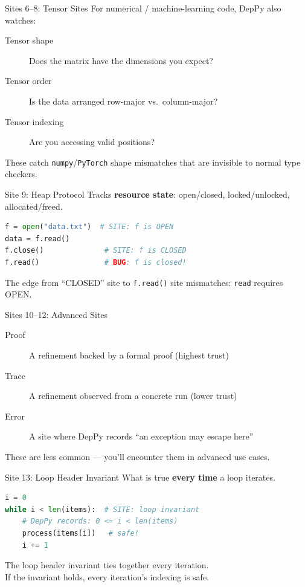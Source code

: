 \documentclass[aspectratio=169,10pt]{beamer}
\begin{document}
\begin{frame}{Sites 6--8: Tensor Sites}
For numerical / machine-learning code, DepPy also watches:
\vspace{0.3em}
\begin{description}
  \item[Tensor shape] Does the matrix have the dimensions you expect?
  \item[Tensor order] Is the data arranged row-major vs.\ column-major?
  \item[Tensor indexing] Are you accessing valid positions?
\end{description}
\vspace{0.3em}
These catch \texttt{numpy}/\texttt{PyTorch} shape mismatches that are invisible to normal type checkers.
\end{frame}

\begin{frame}[fragile]{Site 9: Heap Protocol}
Tracks \textbf{resource state}: open/closed, locked/unlocked, allocated/freed.
\vspace{0.3em}
\begin{lstlisting}[language=Python]
f = open("data.txt")  # SITE: f is OPEN
data = f.read()
f.close()              # SITE: f is CLOSED
f.read()               # BUG: f is closed!
\end{lstlisting}
\vspace{0.3em}
The edge from ``CLOSED'' site to \texttt{f.read()} site mismatches: \texttt{read} requires OPEN.
\end{frame}

\begin{frame}{Sites 10--12: Advanced Sites}
\begin{description}
  \item[Proof] A refinement backed by a formal proof (highest trust)
  \item[Trace] A refinement observed from a concrete run (lower trust)
  \item[Error] A site where DepPy records ``an exception may escape here''
\end{description}
\vspace{0.3em}
These are less common --- you'll encounter them in advanced use cases.
\end{frame}

\begin{frame}[fragile]{Site 13: Loop Header Invariant}
What is true \textbf{every time} a loop iterates.
\vspace{0.3em}
\begin{lstlisting}[language=Python]
i = 0
while i < len(items):  # SITE: loop invariant
    # DepPy records: 0 <= i < len(items)
    process(items[i])   # safe!
    i += 1
\end{lstlisting}
\vspace{0.3em}
The loop header invariant ties together every iteration.\\
If the invariant holds, every iteration's indexing is safe.
\end{frame}
\end{document}
